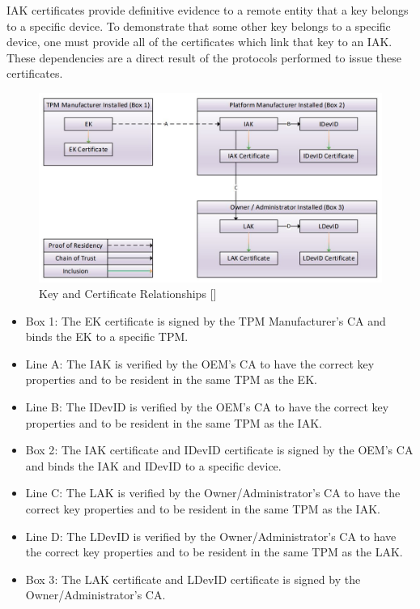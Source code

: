 IAK certificates provide definitive evidence to a remote entity that a key belongs to a specific device. To demonstrate that some other key belongs to a specific device, one must provide all of the certificates which link that key to an IAK. These dependencies are a direct result of the protocols performed to issue these certificates.
\begin{figure}[h]
  \begin{centering}
  \includegraphics[width=\linewidth]{chap_3_figures/certificateRelationships.jpg}
  \par\end{centering}
  \caption{Key and Certificate Relationships [\cite{DevIDSpec-TCG}]}
  \label{fig:cert_rel}
\end{figure}
\begin{itemize}[itemsep=0pt,parsep=0pt,partopsep=0pt]
  \item \textsf{Box 1}: The EK certificate is signed by the TPM Manufacturer's CA and binds the EK to a specific TPM.
  \item \textsf{Line A}: The IAK is verified by the OEM's CA to have the correct key properties and to be resident in the same TPM as the EK.
  \item \textsf{Line B}: The IDevID is verified by the OEM's CA to have the correct key properties and to be resident in the same TPM as the IAK.
  \item \textsf{Box 2}: The IAK certificate and IDevID certificate is signed by the OEM's CA and binds the IAK and IDevID to a specific device.
  \item \textsf{Line C}: The LAK is verified by the Owner/Administrator's CA to have the correct key properties and to be resident in the same TPM as the IAK.
  \item \textsf{Line D}: The LDevID is verified by the Owner/Administrator's CA to have the correct key properties and to be resident in the same TPM as the LAK.
  \item \textsf{Box 3}: The LAK certificate and LDevID certificate is signed by the Owner/Administrator's CA.
\end{itemize}


